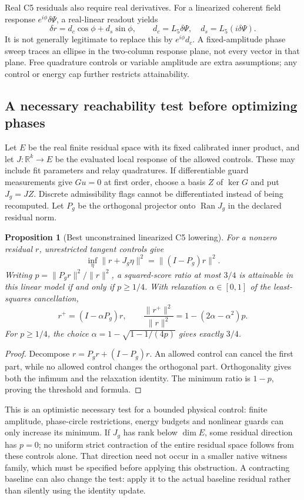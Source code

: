 \documentclass[11pt,a4paper]{article}
\newtheorem{proposition}{Proposition}
\begin{document}
Real C5 residuals also require real derivatives. For a linearized
coherent field response $e^{i\phi}\delta\Psi$, a real-linear
readout yields
\[
 \delta r=d_c\cos\phi+d_s\sin\phi,
 \qquad d_c=L_5\delta\Psi,\quad d_s=L_5(i\delta\Psi).
\]
It is not generally legitimate to replace this by $e^{i\phi}d_c$.
A fixed-amplitude phase sweep traces an ellipse in the two-column
response plane, not every vector in that plane. Free quadrature
controls or variable amplitude are extra assumptions; any control
or energy cap further restricts attainability.

\subsection{A necessary reachability test before optimizing phases}

Let $E$ be the real finite residual space with its fixed calibrated
inner product, and let $J:\mathbb R^k\to E$ be the evaluated local
response of the allowed controls. These may include fit parameters
and relay quadratures. If differentiable guard measurements give
$Gu=0$ at first order, choose a basis $Z$ of $\ker G$ and put
$J_g=JZ$. Discrete admissibility flags cannot be differentiated
instead of being recomputed. Let $P_g$ be the orthogonal projector
onto $\operatorname{Ran}J_g$ in the declared residual norm.

\begin{proposition}[Best unconstrained linearized C5 lowering]
For a nonzero residual $r$, unrestricted tangent controls give
\[
 \inf_\eta\|r+J_g\eta\|^2=\|(I-P_g)r\|^2.
\]
Writing $p=\|P_gr\|^2/\|r\|^2$, a squared-score ratio at most
$3/4$ is attainable in this linear model if and only if $p\ge1/4$.
With relaxation $\alpha\in[0,1]$ of the least-squares cancellation,
\[
 r^+=(I-\alpha P_g)r,\qquad
 \frac{\|r^+\|^2}{\|r\|^2}=1-(2\alpha-\alpha^2)p.
\]
For $p\ge1/4$, the choice
$\alpha=1-\sqrt{1-1/(4p)}$ gives exactly $3/4$.
\end{proposition}
\begin{proof}
Decompose $r=P_gr+(I-P_g)r$. An allowed control can cancel the
first part, while no allowed control changes the orthogonal part.
Orthogonality gives both the infimum and the relaxation identity.
The minimum ratio is $1-p$, proving the threshold and formula.
\end{proof}

This is an optimistic necessary test for a bounded physical control:
finite amplitude, phase-circle restrictions, energy budgets and
nonlinear guards can only increase its minimum. If $J_g$ has rank
below $\dim E$, some residual direction has $p=0$; no uniform
strict contraction of the entire residual space follows from these
controls alone. That direction need not occur in a smaller native
witness family, which must be specified before applying this
obstruction. A contracting baseline can also change the test: apply
it to the actual baseline residual rather than silently using the
identity update.
\end{document}
